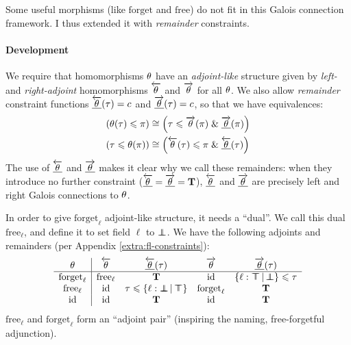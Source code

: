 Some useful morphisms (like $\mathrm{forget}$ and $\mathrm{free}$) do not fit in this Galois connection framework. I thus extended it with \emph{remainder} constraints.

\paragraph{Development}
We require that homomorphisms $\theta$ have an \emph{adjoint-like} structure given by \emph{left-} and \emph{right-adjoint} homomorphisms $\overleftarrow{\theta}$ and $\overrightarrow{\theta}$ for all $\theta$. We also allow \emph{remainder} constraint functions $\underline{\overleftarrow{\theta}}(\tau) = c$ and $\underline{\overrightarrow{\theta}}(\tau) = c$, so that we have equivalences:
\begin{align*}
(\morph(\tau) \sub \pi) &\cstreq \left(\tau \sub \radj \morph(\pi) \und \radjrest \morph(\pi) \right) \\
(\tau \sub \morph(\pi)) &\cstreq \left(\ladj \morph(\tau) \sub \pi \und \ladjrest \morph(\tau) \right)
\end{align*}
The use of $\underline{\overleftarrow{\theta}}$ and $\underline{\overrightarrow{\theta}}$ makes it clear why we call these remainders: when they introduce no further constraint ($\underline{\overleftarrow{\theta}} = \underline{\overrightarrow{\theta}} = \mathbf T$), $\underline{\overleftarrow{\theta}}$ and $\underline{\overrightarrow{\theta}}$ are precisely left and right Galois connections to $\theta$.

\begin{example}
    In order to give $\mathrm{forget}_\ell$  adjoint-like structure, it needs a \enquote{dual}. We call this dual $\mathrm{free}_\ell$, and define it to set field $\ell$ to $\bot \!\!\!\! \bot$. We have the following adjoints and remainders (per Appendix \ref{extra:fl-constraints}):
    $$\begin{array}{c|cccc}
    \morph & \ladj \morph & \ladjrest \morph(\tau) & \radj \morph & \radjrest \morph(\tau) \\ \hline 
    \mathrm{forget}_\ell & \mathrm{free}_\ell & \tru & \mathrm{id} & \flext{\ell : \flftop}{\flfbot} \sub \tau \\
    \mathrm{free}_\ell & \mathrm{id} & \tau \sub \flext{\ell : \flfbot}{\flftop} & \mathrm{forget}_\ell & \tru \\ 
    \mathrm{id} & \mathrm{id} & \tru & \mathrm{id} & \tru 
    \end{array}$$    
    $\mathrm{free}_\ell$ and $\mathrm{forget}_\ell$ form an \enquote{adjoint pair} (inspiring the naming, \cf{} free-forgetful adjunction).
\end{example}

